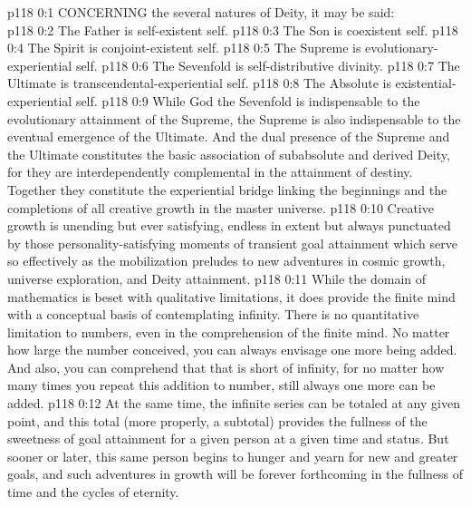\vs p118 0:1 CONCERNING the several natures of Deity, it may be said:\\\parvsfalse
\vs p118 0:2 \bibnobreakspace The Father is self\hyp{}existent self.
\vs p118 0:3 \bibnobreakspace The Son is coexistent self.
\vs p118 0:4 \bibnobreakspace The Spirit is conjoint\hyp{}existent self.
\vs p118 0:5 \bibnobreakspace The Supreme is evolutionary\hyp{}experiential self.
\vs p118 0:6 \bibnobreakspace The Sevenfold is self\hyp{}distributive divinity.
\vs p118 0:7 \bibnobreakspace The Ultimate is transcendental\hyp{}experiential self.
\vs p118 0:8 \bibnobreakspace The Absolute is existential\hyp{}experiential self.
\vs p118 0:9 \pc While God the Sevenfold is indispensable to the evolutionary attainment of the Supreme, the Supreme is also indispensable to the eventual emergence of the Ultimate. And the dual presence of the Supreme and the Ultimate constitutes the basic association of subabsolute and derived Deity, for they are interdependently complemental in the attainment of destiny. Together they constitute the experiential bridge linking the beginnings and the completions of all creative growth in the master universe.
\vs p118 0:10 \pc Creative growth is unending but ever satisfying, endless in extent but always punctuated by those personality\hyp{}satisfying moments of transient goal attainment which serve so effectively as the mobilization preludes to new adventures in cosmic growth, universe exploration, and Deity attainment.
\vs p118 0:11 While the domain of mathematics is beset with qualitative limitations, it does provide the finite mind with a conceptual basis of contemplating infinity. There is no quantitative limitation to numbers, even in the comprehension of the finite mind. No matter how large the number conceived, you can always envisage one more being added. And also, you can comprehend that that is short of infinity, for no matter how many times you repeat this addition to number, still always one more can be added.
\vs p118 0:12 At the same time, the infinite series can be totaled at any given point, and this total (more properly, a subtotal) provides the fullness of the sweetness of goal attainment for a given person at a given time and status. But sooner or later, this same person begins to hunger and yearn for new and greater goals, and such adventures in growth will be forever forthcoming in the fullness of time and the cycles of eternity.
